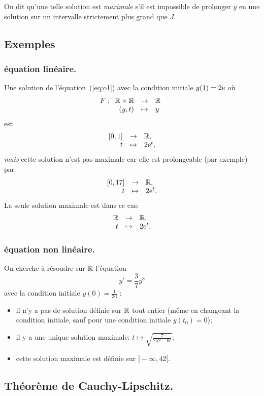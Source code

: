 On dit qu'une telle solution est \emph{maximale} s'il est
impossible de prolonger $y$ en une solution sur un intervalle strictement
plus grand que $J$.

\subsection{Exemples}
\subsubsection*{équation linéaire.}
Une solution de l'équation~(\ref{eq:o1}) avec la condition initiale $y(1)=2
\mathrm{e}$ où
\begin{equation*}
  F:\begin{array}[t]{rcl} \mathbb{R}\times \mathbb{R} & \rightarrow & \mathbb{R}\\ (y,t) & \mapsto & y\\ \end{array}
\end{equation*}
est
\begin{equation*}
  \begin{array}[t]{rcl} [0,1] & \rightarrow & \mathbb{R},\\ t & \mapsto & 2 \mathrm{e}^{t},\\ \end{array}
\end{equation*}
\emph{mais} cette solution n'est pas maximale car elle est prolongeable (par exemple) par
\begin{equation*}
  \begin{array}[t]{rcl} [0,17] & \rightarrow & \mathbb{R},\\ t & \mapsto & 2 \mathrm{e}^{t}.\\ \end{array}
\end{equation*}
La seule solution maximale est dans ce cas:
\begin{equation*}
  \begin{array}[t]{rcl} \mathbb{R} & \rightarrow & \mathbb{R},\\ t & \mapsto & 2\mathrm{e}^{t}.\\ \end{array}
\end{equation*}

\subsubsection*{équation non linéaire.}

On cherche à résoudre sur $\mathbb{R}$ l'équation
\begin{equation*}
  y' = \frac{3}{7}y^{3}
\end{equation*}
avec la condition initiale $y(0)=\frac{1}{36}$ :

\begin{itemize}
\item il n'y a pas de solution définie sur $\mathbb{R}$ tout entier (même en
  changeant la condition initiale, sauf pour une condition initiale $y(t_{0})=0$);
\item il y a une unique solution maximale: $t\mapsto\sqrt{\frac{7}{252 - 6t}}$;
\item cette solution maximale est définie sur $]-\infty, 42[$.
\end{itemize}
\subsection{Théorème de Cauchy-Lipschitz.}

